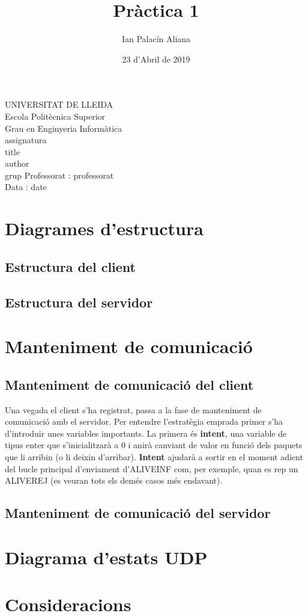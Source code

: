 \documentclass{article}
\title{Pràctica 1}
\author{Ian Palacín Aliana}
\date{23 d'Abril de 2019}
\renewcommand{\maketitle}{ %
    \begin{titlepage}
        \raggedright{UNIVERSITAT DE LLEIDA \\
            Escola Politècnica Superior \\
            Grau en Enginyeria Informàtica\\
            \1assignatura\\}
            \vspace{5cm}
            \centering\huge{\5title \\}
            \vspace{3cm}
            \large{\6author} \\
            \normalsize{\3grup}
            \vfill
            Professorat : \4professorat \\
            Data : \7date
\end{titlepage}}
\begin{document}
\nocite{*}
\maketitle
\thispagestyle{empty}

\newpage
{}
\tableofcontents
\newpage
{}

\section{Diagrames d'estructura}
\subsection{Estructura del client}
\subsection{Estructura del servidor}
\section{Manteniment de comunicació}
\subsection{Manteniment de comunicació del client}

Una vegada el client s'ha registrat, passa a la fase de manteniment
de comunicació amb el servidor. Per entendre l'estratègia emprada
primer s'ha d'introduir unes variables importants. La primera
és \textbf{intent}, una variable de tipus enter que s'inicialitzarà a
0 i anirà canviant de valor en funció dels paquets que li arribin (o li
deixin d'arribar). \textbf{Intent} ajudarà a sortir en el moment adient
del bucle principal d'enviament d'ALIVE\textunderscore INF com, per 
exemple, quan es rep un ALIVE\textunderscore REJ (es veuran tots els 
demés casos més endavant).













\subsection{Manteniment de comunicació del servidor}
\section{Diagrama d'estats UDP}
\section{Consideracions}
\end{document}
